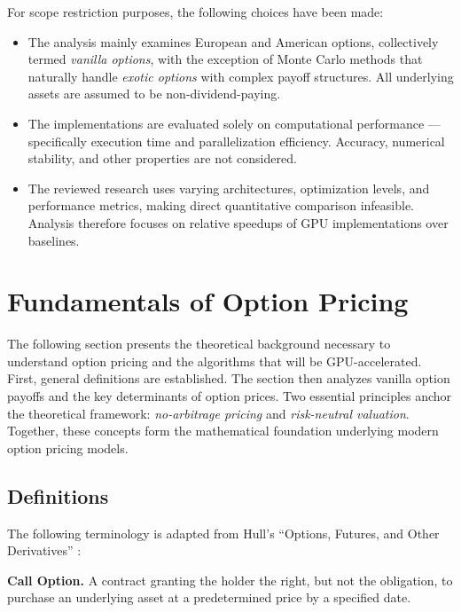 \documentclass[english,12pt,a4paper,pdftex,sci,utf8]{aaltothesis}
\begin{document}
For scope restriction purposes, the following choices have been made:
\begin{itemize}\setlength\itemsep{0.1em}
\item The analysis mainly examines European and American options, collectively termed \emph{vanilla options}, with the exception of Monte Carlo methods that naturally handle \emph{exotic options} with complex payoff structures. All underlying assets are assumed to be non-dividend-paying.
    
\item The implementations are evaluated solely on computational performance --- specifically execution time and parallelization efficiency. Accuracy, numerical stability, and other properties are not considered.

\item The reviewed research uses varying architectures, optimization levels, and performance metrics, making direct quantitative comparison infeasible. \mbox{Analysis} therefore focuses on relative speedups of GPU implementations over baselines.
\end{itemize}

\clearpage

\section{Fundamentals of Option Pricing} \label{sec:theory}

The following section presents the theoretical background necessary to understand option pricing and the algorithms that will be GPU-accelerated. First, general definitions are established. The section then analyzes vanilla option payoffs and the key determinants of option prices. Two essential principles anchor the theoretical framework: \emph{no-arbitrage pricing} and \emph{risk-neutral valuation}. Together, these concepts form the mathematical foundation underlying modern option pricing models.

\subsection{Definitions}\label{subsec:definitions}
The following terminology is adapted from Hull's ``Options, Futures, and Other Derivatives'' \cite{hull2018}:

\vspace{0.5\baselineskip}
\noindent\textbf{Call Option.} A contract granting the holder the right, but not the obligation, to purchase an underlying asset at a predetermined price by a specified date.
\end{document}
